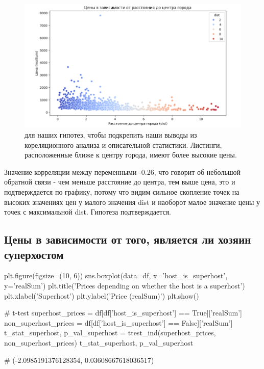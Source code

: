 \documentclass[
	11pt
] {article}
\begin{document}
	\begin{figure}[H]


		\centering
		\includegraphics[width=1.0\textwidth]{fig-02}
		\caption{для наших гипотез, чтобы подкрепить наши выводы из кореляционного анализа и описательной статистики. Листинги, расположенные ближе к центру города, имеют более высокие цены.}
	\end{figure}

	Значение корреляции между переменными -0.26, что говорит об небольшой обратной связи - чем меньше расстояние до центра, тем выше цена, это и подтверждается по графику, потому что видим сильное скопление точек на высоких значениях цен у малого значения dist и наоборот малое значение цены у точек с максимальной dist. Гипотеза подтверждается.

\subsection{Цены в зависимости от того, является ли хозяин суперхостом}
\begin{python}
plt.figure(figsize=(10, 6))
sns.boxplot(data=df, x='host_is_superhost', y='realSum')
plt.title('Prices depending on whether the host is a superhost')
plt.xlabel('Superhost')
plt.ylabel('Price (realSum)')
plt.show()

# t-test
superhost_prices = df[df['host_is_superhost'] == True]['realSum']
non_superhost_prices = df[df['host_is_superhost'] == False]['realSum']
t_stat_superhost, p_val_superhost = ttest_ind(superhost_prices, non_superhost_prices)
t_stat_superhost, p_val_superhost

# (-2.0985191376128354, 0.03608667618036517)

\end{python}
\end{document}
